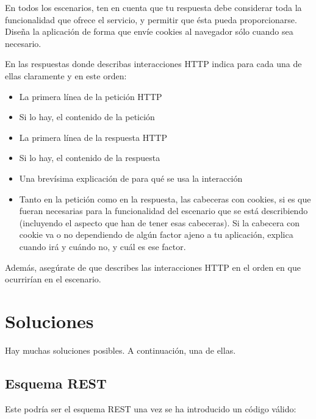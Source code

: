 En todos los escenarios, ten en cuenta que tu respuesta debe considerar toda la funcionalidad que ofrece el servicio, y permitir que ésta pueda proporcionarse. Diseña la aplicación de forma que envíe cookies al navegador sólo cuando sea necesario.

En las respuestas donde describas interacciones HTTP indica para cada una de ellas claramente y en este orden:
  \begin{itemize}
  \item La primera línea de la petición HTTP
  \item Si lo hay, el contenido de la petición
  \item La primera línea de la respuesta HTTP
  \item Si lo hay, el contenido de la respuesta
  \item Una brevísima explicación de para qué se usa la interacción
  \item Tanto en la petición como en la respuesta, las cabeceras con cookies, si es que fueran necesarias para la funcionalidad del escenario que se está describiendo (incluyendo el aspecto que han de tener esas cabeceras). Si la cabecera con cookie va o no dependiendo de algún factor ajeno a tu aplicación, explica cuando irá y cuándo no, y cuál es ese factor.
  \end{itemize}

Además, asegúrate de que describes las interacciones HTTP en el orden en que ocurrirían en el escenario.

\section*{Soluciones}

Hay muchas soluciones posibles. A continuación, una de ellas.

\subsection*{Esquema REST}

Este podría ser el esquema REST una vez se ha introducido un código válido:

